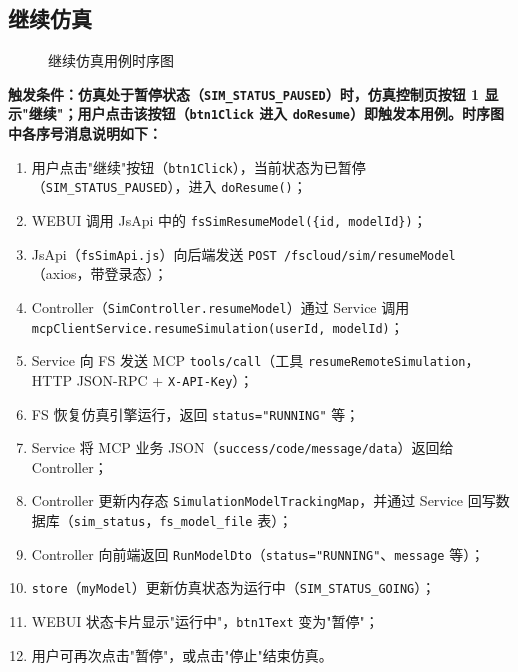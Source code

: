 \subsection{继续仿真}
\begin{figure}[!h]
	\centering
	\resizebox{1.0\linewidth}{!}{}
	\caption{继续仿真用例时序图}\label{fig:resumeModel}
\end{figure}
\bf{触发条件}：仿真处于暂停状态（\texttt{SIM\_STATUS\_PAUSED}）时，仿真控制页按钮 1 显示"继续"；用户点击该按钮（\texttt{btn1Click} 进入 \texttt{doResume}）即触发本用例。时序图中各序号消息说明如下：
\begin{enumerate}[label=\arabic*)]
	\item 用户点击"继续"按钮（\texttt{btn1Click}），当前状态为已暂停（\texttt{SIM\_STATUS\_PAUSED}），进入 \texttt{doResume()}；
	\item WEBUI 调用 JsApi 中的 \texttt{fsSimResumeModel(\{id, modelId\})}；
	\item JsApi（\texttt{fsSimApi.js}）向后端发送 \texttt{POST /fscloud/sim/resumeModel}（axios，带登录态）；
	\item Controller（\texttt{SimController.resumeModel}）通过 Service 调用 \texttt{mcpClientService.resumeSimulation(userId, modelId)}；
	\item Service 向 FS 发送 MCP \texttt{tools/call}（工具 \texttt{resumeRemoteSimulation}，HTTP JSON-RPC + \texttt{X-API-Key}）；
	\item FS 恢复仿真引擎运行，返回 \texttt{status="RUNNING"} 等；
	\item Service 将 MCP 业务 JSON（\texttt{success/code/message/data}）返回给 Controller；
	\item Controller 更新内存态 \texttt{SimulationModelTrackingMap}，并通过 Service 回写数据库（\texttt{sim\_status}，\texttt{fs\_model\_file} 表）；
	\item Controller 向前端返回 \texttt{RunModelDto}（\texttt{status="RUNNING"}、\texttt{message} 等）；
	\item \texttt{store}（\texttt{myModel}）更新仿真状态为运行中（\texttt{SIM\_STATUS\_GOING}）；
	\item WEBUI 状态卡片显示"运行中"，\texttt{btn1Text} 变为"暂停"；
	\item 用户可再次点击"暂停"，或点击"停止"结束仿真。
\end{enumerate}
\newpage
